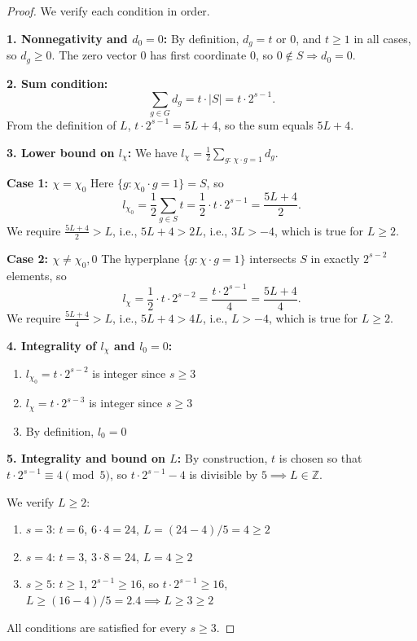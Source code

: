 \documentclass[12pt,twoside,]{amsart}
\theoremstyle{plain}
\theoremstyle{definition}
\begin{document}
\begin{proof}
We verify each condition in order.

\noindent \textbf{1. Nonnegativity and \( d_0 = 0 \):}  
By definition, \( d_g = t \) or \( 0 \), and \( t \ge 1 \) in all cases, so \( d_g \ge 0 \).  
The zero vector \( 0 \) has first coordinate $0$, so \( 0 \notin S  \Rightarrow  d_0 = 0 \).

\noindent \textbf{2. Sum condition:}  
\[
\sum_{g \in G} d_g = t \cdot |S| = t \cdot 2^{s-1}.
\]
From the definition of \( L \), \( t \cdot 2^{s-1} = 5L + 4 \), so the sum equals \( 5L + 4 \).

\noindent \textbf{3. Lower bound on \( l_\chi \):}  
We have \( l_\chi = \frac12 \sum_{g:\, \chi \cdot g = 1} d_g \).

\textbf{Case 1: \( \chi = \chi_0 \)}  
Here \( \{ g : \chi_0 \cdot g = 1 \} = S \), so  
\[
l_{\chi_0} = \frac12 \sum_{g \in S} t = \frac12 \cdot t \cdot 2^{s-1} = \frac{5L+4}{2}.
\]
We require \( \frac{5L+4}{2} > L \), i.e., \( 5L+4 > 2L \), i.e., \( 3L > -4 \), which is true for \( L \ge 2 \).

\textbf{Case 2: \( \chi \ne \chi_0, 0 \)}  
The hyperplane \( \{ g : \chi \cdot g = 1 \} \) intersects \( S \) in exactly \( 2^{s-2} \) elements, so  
\[
l_\chi = \frac12 \cdot t \cdot 2^{s-2} = \frac{t \cdot 2^{s-1}}{4} = \frac{5L+4}{4}.
\]
We require \( \frac{5L+4}{4} > L \), i.e., \( 5L+4 > 4L \), i.e., \( L > -4 \), which is true for \( L \ge 2 \).

\noindent \textbf{4. Integrality of \( l_\chi \) and \( l_0 = 0 \):}  
\begin{enumerate}
    \item \( l_{\chi_0} = t \cdot 2^{s-2} \) is integer since \( s \ge 3 \)
    \item \( l_{\chi} = t \cdot 2^{s-3} \) is integer since \( s \ge 3 \)
    \item By definition, \( l_0 = 0 \)
\end{enumerate}

\noindent \textbf{5. Integrality and bound on \( L \):}  
By construction, \( t \) is chosen so that \( t \cdot 2^{s-1} \equiv 4 \pmod{5} \),  
so \( t \cdot 2^{s-1} - 4 \) is divisible by \(5 \implies L \in \mathbb{Z} \).

We verify \( L \ge 2 \):
\begin{enumerate}
    \item \( s = 3 \): \( t = 6 \), \( 6 \cdot 4 = 24 \), \( L = (24-4)/5 = 4 \ge 2 \)
    \item \( s = 4 \): \( t = 3 \), \( 3 \cdot 8 = 24 \), \( L = 4 \ge 2 \)
    \item \( s \ge 5 \): \( t \ge 1 \), \( 2^{s-1} \ge 16 \), so \( t \cdot 2^{s-1} \ge 16 \),  
    \( L \ge (16-4)/5 = 2.4  \implies  L \ge 3 \ge 2 \)
\end{enumerate}

All conditions are satisfied for every \( s \ge 3 \).
\end{proof}
















\end{document}
